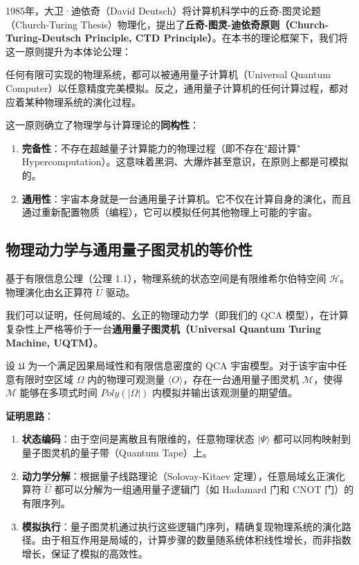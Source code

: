 1985年，大卫·迪依奇（David Deutsch）将计算机科学中的丘奇-图灵论题（Church-Turing Thesis）物理化，提出了\textbf{丘奇-图灵-迪依奇原则（Church-Turing-Deutsch Principle, CTD Principle）}。在本书的理论框架下，我们将这一原则提升为本体论公理：

\begin{axiom}
任何有限可实现的物理系统，都可以被通用量子计算机（Universal Quantum Computer）以任意精度完美模拟。反之，通用量子计算机的任何计算过程，都对应着某种物理系统的演化过程。
\end{axiom}

这一原则确立了物理学与计算理论的\textbf{同构性}：

\begin{enumerate}
\item \textbf{完备性}：不存在超越量子计算能力的物理过程（即不存在"超计算" Hypercomputation）。这意味着黑洞、大爆炸甚至意识，在原则上都是可模拟的。

\item \textbf{通用性}：宇宙本身就是一台通用量子计算机。它不仅在计算自身的演化，而且通过重新配置物质（编程），它可以模拟任何其他物理上可能的宇宙。
\end{enumerate}

\subsection{物理动力学与通用量子图灵机的等价性}

基于有限信息公理（公理 1.1），物理系统的状态空间是有限维希尔伯特空间 $\mathcal{H}$。物理演化由幺正算符 $\hat{U}$ 驱动。

我们可以证明，任何局域的、幺正的物理动力学（即我们的 QCA 模型），在计算复杂性上严格等价于一台\textbf{通用量子图灵机（Universal Quantum Turing Machine, UQTM）}。

\begin{theorem}[物理-计算等价定理]
设 $\mathfrak{U}$ 为一个满足因果局域性和有限信息密度的 QCA 宇宙模型。对于该宇宙中任意有限时空区域 $\Omega$ 内的物理可观测量 $\langle O \rangle$，存在一台通用量子图灵机 $\mathcal{M}$，使得 $\mathcal{M}$ 能够在多项式时间 $Poly(|\Omega|)$ 内模拟并输出该观测量的期望值。
\end{theorem}

\textbf{证明思路}：

\begin{enumerate}
\item \textbf{状态编码}：由于空间是离散且有限维的，任意物理状态 $|\Psi\rangle$ 都可以同构映射到量子图灵机的量子带（Quantum Tape）上。

\item \textbf{动力学分解}：根据量子线路理论（Solovay-Kitaev 定理），任意局域幺正演化算符 $\hat{U}$ 都可以分解为一组通用量子逻辑门（如 Hadamard 门和 CNOT 门）的有限序列。

\item \textbf{模拟执行}：量子图灵机通过执行这些逻辑门序列，精确复现物理系统的演化路径。由于相互作用是局域的，计算步骤的数量随系统体积线性增长，而非指数增长，保证了模拟的高效性。
\end{enumerate}

